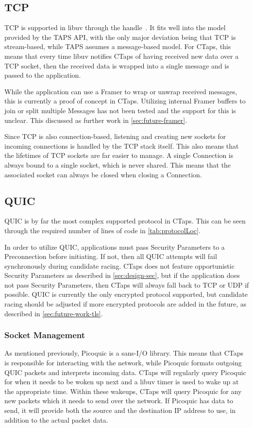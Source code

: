 \subsection{TCP}
TCP is supported in libuv through the  handle~\cite{libuvLibuvTCPHandle}.
It fits well into the model provided by the TAPS API,
with the only major deviation being that TCP is stream-based,
while TAPS assumes a message-based model.
For CTaps, this means that every time libuv notifies CTaps of having
received new data over a TCP socket, then the received data is wrapped into a
single message and is passed to the application. 

While the application can use a Framer to wrap or unwrap received messages, this is currently
a proof of concept in CTaps.
Utilizing internal Framer buffers to join or split multiple Messages has not
been tested and the support for this is unclear. This discussed as further work
in \cref{sec:future-framer}.

Since TCP is also connection-based, listening and creating new sockets
for incoming connections is handled by the TCP stack itself. 
This also means that the lifetimes of TCP sockets are far easier to manage.
A single Connection is always
bound to a single socket, which is never shared. This means that
the associated socket can always be closed when closing a Connection.

\subsection{QUIC} \label{sec:quicImpl}
QUIC is by far the most complex supported protocol in CTaps.
This can be seen through the required number of lines of code in 
\cref{tab:protocolLoc}.

In order to utilize QUIC, applications must pass Security Parameters
to a Preconnection before initiating. If not, then all QUIC attempts will fail synchronously during
candidate racing. CTaps does not feature opportunistic
Security Parameters as described in \cref{sec:design-sec}, but if the application
does not pass Security Parameters, then CTaps will always fall back to TCP or UDP
if possible. QUIC is currently
the only encrypted protocol supported, but candidate racing should be adjusted
if more encrypted protocols
are added in the future, as described in \cref{sec:future-work-tls}.

\subsubsection{Socket Management}
As mentioned previously, Picoquic is a sans-I/O library. This means that CTaps is responsible for
interacting with the network, while Picoquic formats outgoing QUIC packets and interprets incoming data.
CTaps will regularly query Picoquic for when it needs to be woken up next
and a libuv timer is used to wake up at the appropriate time.
Within these wakeups, CTaps will query Picoquic for any new packets which it needs to send over the network.
If Picoquic has data to send, it will provide both the source and the destination IP address to use,
in addition to the actual packet data.

